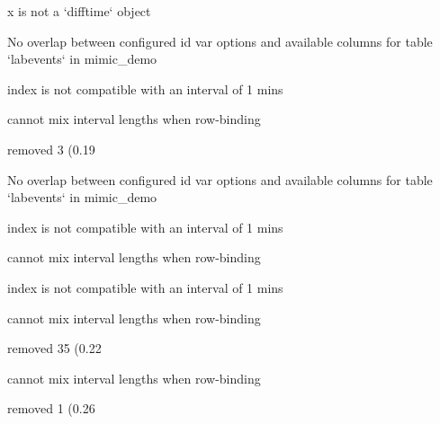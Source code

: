 \documentclass[
]{jss}
\begin{document}
\begin{CodeChunk}
\begin{CodeOutput}
x is not a `difftime` object
\end{CodeOutput}

\begin{CodeOutput}
No overlap between configured id var options and available columns for table
`labevents` in mimic_demo
\end{CodeOutput}

\begin{CodeOutput}
index is not compatible with an interval of 1 mins
\end{CodeOutput}

\begin{CodeOutput}
cannot mix interval lengths when row-binding
\end{CodeOutput}

\begin{CodeOutput}
removed 3 (0.19%
\end{CodeOutput}

\begin{CodeOutput}
No overlap between configured id var options and available columns for table
`labevents` in mimic_demo
\end{CodeOutput}

\begin{CodeOutput}
index is not compatible with an interval of 1 mins
\end{CodeOutput}

\begin{CodeOutput}
cannot mix interval lengths when row-binding
\end{CodeOutput}

\begin{CodeOutput}
index is not compatible with an interval of 1 mins
\end{CodeOutput}

\begin{CodeOutput}
cannot mix interval lengths when row-binding
\end{CodeOutput}

\begin{CodeOutput}
removed 35 (0.22%
\end{CodeOutput}

\begin{CodeOutput}
cannot mix interval lengths when row-binding
\end{CodeOutput}

\begin{CodeOutput}
removed 1 (0.26%
\end{CodeOutput}


\end{CodeChunk}
\end{document}
